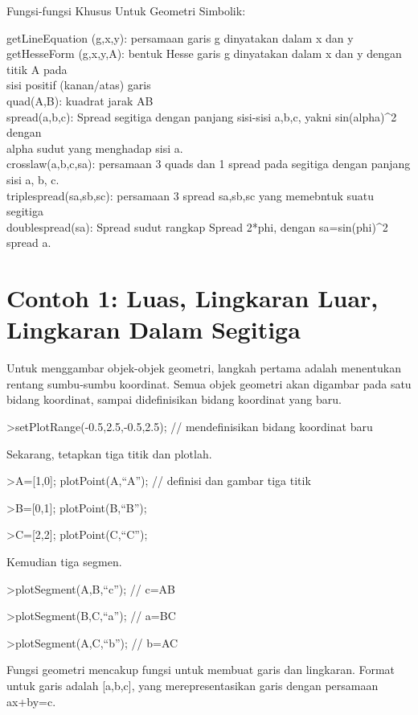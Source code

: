 \documentclass[
]{book}
\begin{document}
Fungsi-fungsi Khusus Untuk Geometri Simbolik:

getLineEquation (g,x,y): persamaan garis g dinyatakan dalam x dan y\\
getHesseForm (g,x,y,A): bentuk Hesse garis g dinyatakan dalam x dan y dengan titik A pada\\
sisi positif (kanan/atas) garis\\
quad(A,B): kuadrat jarak AB\\
spread(a,b,c): Spread segitiga dengan panjang sisi-sisi a,b,c, yakni sin(alpha)\^{}2 dengan\\
alpha sudut yang menghadap sisi a.\\
crosslaw(a,b,c,sa): persamaan 3 quads dan 1 spread pada segitiga dengan panjang sisi a, b, c.\\
triplespread(sa,sb,sc): persamaan 3 spread sa,sb,sc yang memebntuk suatu segitiga\\
doublespread(sa): Spread sudut rangkap Spread 2*phi, dengan sa=sin(phi)\^{}2 spread a.

\section{Contoh 1: Luas, Lingkaran Luar, Lingkaran Dalam Segitiga}\label{contoh-1-luas-lingkaran-luar-lingkaran-dalam-segitiga}

Untuk menggambar objek-objek geometri, langkah pertama adalah menentukan rentang sumbu-sumbu koordinat. Semua objek geometri akan digambar pada satu bidang koordinat, sampai didefinisikan bidang koordinat yang baru.

\textgreater setPlotRange(-0.5,2.5,-0.5,2.5); // mendefinisikan bidang koordinat baru

Sekarang, tetapkan tiga titik dan plotlah.

\textgreater A={[}1,0{]}; plotPoint(A,``A''); // definisi dan gambar tiga titik

\textgreater B={[}0,1{]}; plotPoint(B,``B'');

\textgreater C={[}2,2{]}; plotPoint(C,``C'');

Kemudian tiga segmen.

\textgreater plotSegment(A,B,``c''); // c=AB

\textgreater plotSegment(B,C,``a''); // a=BC

\textgreater plotSegment(A,C,``b''); // b=AC

Fungsi geometri mencakup fungsi untuk membuat garis dan lingkaran. Format untuk garis adalah {[}a,b,c{]}, yang merepresentasikan garis dengan persamaan ax+by=c.
\end{document}
